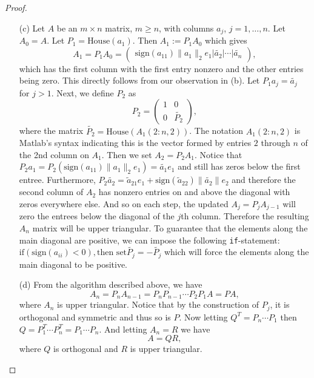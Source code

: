 \documentclass[12pt]{report}
\begin{document}
\begin{problem}
\begin{proof}
\begin{enumerate}
    \item [(c)] 
    Let $A$ be an $m \times n$ matrix, $m\geq n$, with columns $a_j$, $j=1,\dots,n$. Let $A_0 = A$. Let $P_1 = \text{House}(a_1).$ Then $A_1 := P_1A_0$ which gives
    \[
      A_1 = P_1A_0 = \begin{pmatrix}
          \text{sign}(a_{11})\|a_1\|_2e_1 \Big| \tilde{a_2} \Big| \cdots \Big| \tilde{a_n}
      \end{pmatrix},
    \]
    which has the first column with the first entry nonzero and the other entries being zero. This directly follows from our observation in (b). Let $P_1a_j = \tilde{a_j}$ for $j>1$. Next, we define $P_2$ as
    \[
         P_2 = \begin{pmatrix}
            1&0\\0&\tilde{P_2}
         \end{pmatrix},
    \]
    where the matrix $\tilde{P_2} = \text{House}(A_1(2:n,2))$. The notation $A_1(2:n,2)$ is Matlab's syntax indicating this is the vector formed by entries $2$ through $n$ of the 2nd column on $A_1$. Then we set $A_2 = P_2 A_1$. Notice that $P_2a_1 = P_2(\text{sign}(a_{11})\|a_1\|_2e_1) = \tilde{a_1}e_1$ and still has zeros below the first entree. Furthermore, $P_2\tilde{a_2} = \tilde{a}_{21}e_1 + \text{sign}(\tilde{a}_{22})\|\tilde{a_{2}}\|e_2$ and therefore the second column of $A_2$ has nonzero entries on and above the diagonal with zeros everywhere else. And so on each step, the updated $A_j = P_jA_{j-1}$ will zero the entrees below the diagonal of the $j$th column. Therefore the resulting $A_n$ matrix will be upper triangular. To guarantee that the elements along the main diagonal are positive, we can impose the following \verb+if+-statement: $\text{if}(\text{sign}(a_{ii}) < 0), \text{then set} \tilde{P_j} = - \tilde{P_j}$ which will force the elements along the main diagonal to be positive.



    \item [(d)]
    From the algorithm described above, we have 
    \[
      A_n = P_nA_{n-1} = P_nP_{n-1}\cdots P_2 P_1 A = PA,
    \]
    where $A_n$ is upper triangular. Notice that by the construction of $P_j$, it is orthogonal and symmetric and thus so is $P$. Now letting $Q^T = P_n\cdots P_1$ then $Q = P_1^T \cdots P_n^T = P_1 \cdots P_n$. And letting $A_n = R$ we have
    \[
      A = QR,
    \]
    where $Q$ is orthogonal and $R$ is upper triangular.
\end{enumerate}

\end{proof}
\end{problem}
\end{document}
